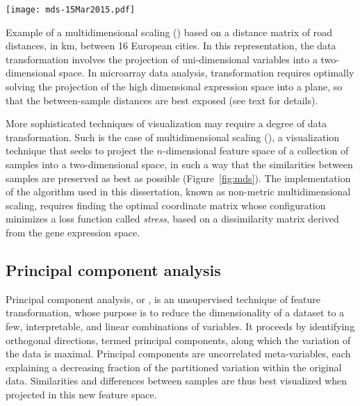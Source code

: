 
\begin{marginfigure}%
    \texttt{[image: mds-15Mar2015.pdf]}
    \caption[Example of a multidimesional scaling]{Example of a multidimensional
      scaling () based on a distance matrix of road distances, in
      km, between 16 European cities.  In this representation, the data
      transformation involves the projection of uni-dimensional variables into a
      two-dimensional space.  In microarray data analysis, 
      transformation requires optimally solving the projection of the high
      dimensional expression space into a plane, so that the between-sample
      distances are best exposed (see text for details).}
    \label{fig:mds}%
\end{marginfigure}

More sophisticated techniques of visualization may require a degree of data
transformation.  Such is the case of multidimensional scaling (),
a visualization technique that seeks to project the $n$-dimensional feature
space of a collection of samples into a two-dimensional space, in such a way
that the similarities between samples are preserved as best as possible
(Figure~\ref{fig:mds}).  The implementation of the  algorithm
used in this dissertation, known as non-metric multidimensional scaling,
requires finding the optimal coordinate matrix whose configuration minimizes a
loss function called \emph{stress}, based on a dissimilarity matrix derived from
the gene expression space.\cite{borg_modern_2005}

\subsection{Principal component analysis}
\label{sec:methods-pc}
Principal component analysis, or , is an unsupervised technique
of feature transformation, whose purpose is to reduce the dimensionality of a
dataset to a few, interpretable, and linear combinations of
variables.\cite{pearson_liii._1901} It proceeds by identifying orthogonal
directions, termed principal components, along which the variation of the data
is maximal.  Principal components are uncorrelated meta-variables, each
explaining a decreasing fraction of the partitioned variation within the
original data.  Similarities and differences between samples are thus best
visualized when projected in this new feature space.

